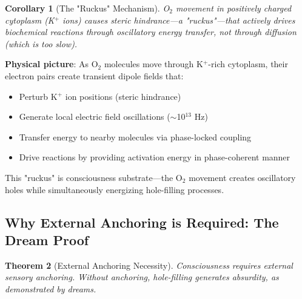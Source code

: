 \documentclass[11pt,a4paper]{article}
\newtheorem{theorem}{Theorem}
\newtheorem{corollary}[theorem]{Corollary}
\begin{document}
\begin{corollary}[The "Ruckus" Mechanism]
O$_2$ movement in positively charged cytoplasm (K$^+$ ions) causes steric hindrance—a "ruckus"—that actively drives biochemical reactions through oscillatory energy transfer, not through diffusion (which is too slow).
\end{corollary}

\textbf{Physical picture}: As O$_2$ molecules move through K$^+$-rich cytoplasm, their electron pairs create transient dipole fields that:
\begin{itemize}
\item Perturb K$^+$ ion positions (steric hindrance)
\item Generate local electric field oscillations ($\sim$10$^{13}$ Hz)
\item Transfer energy to nearby molecules via phase-locked coupling
\item Drive reactions by providing activation energy in phase-coherent manner
\end{itemize}

This "ruckus" is consciousness substrate—the O$_2$ movement creates oscillatory holes while simultaneously energizing hole-filling processes.

\subsection{Why External Anchoring is Required: The Dream Proof}

\begin{theorem}[External Anchoring Necessity]
\label{thm:external_anchoring}
Consciousness requires external sensory anchoring. Without anchoring, hole-filling generates absurdity, as demonstrated by dreams.
\end{theorem}
\end{document}
